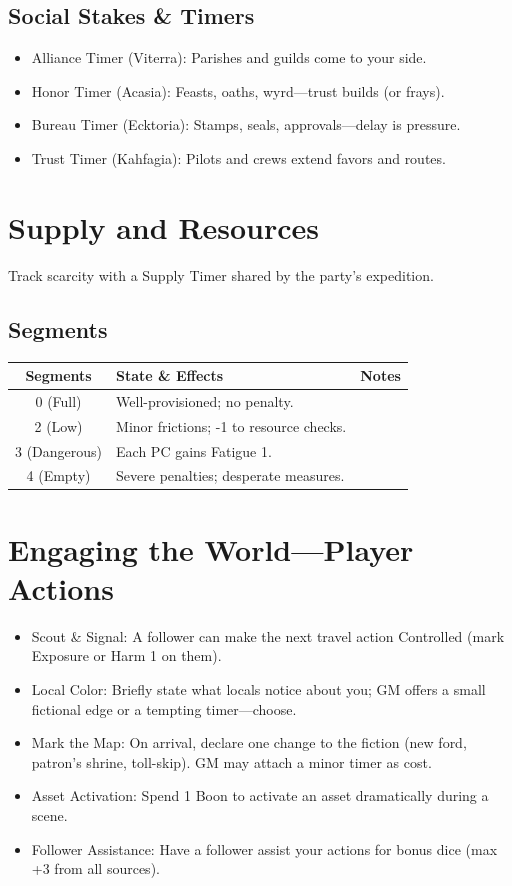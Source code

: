\documentclass[11pt,twoside,openany]{book}
\begin{document}
\subsection*{Social Stakes \& Timers}

\begin{itemize}
\item Alliance Timer (Viterra): Parishes and guilds come to your side.
\item Honor Timer (Acasia): Feasts, oaths, wyrd---trust builds (or frays).
\item Bureau Timer (Ecktoria): Stamps, seals, approvals---delay is pressure.
\item Trust Timer (Kahfagia): Pilots and crews extend favors and routes.
\end{itemize}

\section*{Supply and Resources} 

Track scarcity with a Supply Timer shared by the party's expedition.

\subsection*{Segments}

\begin{center}
\begin{tabular}{|c|l|l|}
\hline
\textbf{Segments} & \textbf{State \& Effects} & \textbf{Notes} \\
\hline
0 (Full) & Well-provisioned; no penalty. & \\
2 (Low) & Minor frictions; -1 to resource checks. & \\
3 (Dangerous) & Each PC gains Fatigue 1. & \\
4 (Empty) & Severe penalties; desperate measures. & \\
\hline
\end{tabular}
\end{center}

\section*{Engaging the World---Player Actions} 

\begin{itemize}
\item Scout \& Signal: A follower can make the next travel action Controlled (mark Exposure or Harm 1 on them).
\item Local Color: Briefly state what locals notice about you; GM offers a small fictional edge or a tempting timer---choose.
\item Mark the Map: On arrival, declare one change to the fiction (new ford, patron's shrine, toll-skip). GM may attach a minor timer as cost.
\item Asset Activation: Spend 1 Boon to activate an asset dramatically during a scene.
\item Follower Assistance: Have a follower assist your actions for bonus dice (max +3 from all sources).
\end{itemize}
\end{document}
